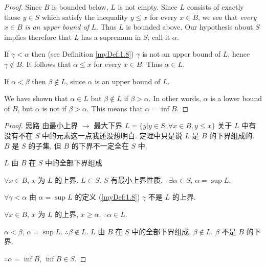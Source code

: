 \begin{proof}
Since $B$ is bounded below, $L$ is not empty. Since $L$ consists of
exactly those $y \in S$ which satisfy the inequality $y \leq x$ for every $x \in B$, we
see that \emph{every} $x \in B$ \emph{is an upper bound of} $L$. Thus $L$ is bounded above.
Our hypothesis about $S$ implies therefore that $L$ has a supremum in $S$;
call it $\alpha$.

If $\gamma <\alpha$ then (see Definition \ref{myDef:1.8}) $\gamma$ is not an upper bound of $L$,
hence $\gamma \not\in B$. It follows that $\alpha \leq x$ for every $x \in B$. Thus $\alpha \in L$.

If $\alpha < \beta$ then $\beta \not\in L$, since $\alpha$ is an upper bound of $L$.

We have shown that $\alpha \in L$ but $\beta \not\in  L$ if $\beta>\alpha$. In other words, $\alpha$
is a lower bound of $B$, but $\alpha$ is not if $\beta > \alpha$. This means that $\alpha = \inf B$.
\end{proof}


    \begin{proof}
思路 由最小上界 $\rightarrow $ 最大下界
$L = \{y| y\in S; \forall x\in B, y\leq x\}$
    关于 $L$ 中有没有不在 $S$ 中的元素这一点我还没想明白. 定理中只是说 $L$ 是 $B$ 的下界组成的. $B$ 是 $S$ 的子集, 但 $B$ 的下界不一定全在 $S$ 中. 

$L$ 由 $B$ 在 $S$ 中的全部下界组成

$\forall x\in B$, $x$ 为 $L$ 的上界. $L\subset S$.
$S$ 有最小上界性质,
$\therefore \exists \alpha\in S$, $\alpha = \sup L$.

$\forall \gamma <\alpha$ 由 $\alpha = \sup L$ 的定义 (\ref{myDef:1.8})
$\gamma$ 不是 $L$ 的上界.

$\forall x \in B$, $x$ 为 $L$ 的上界, $x \geq \alpha$. $\therefore \alpha \in L$.

$\alpha < \beta$, $\alpha = \sup L$. $\therefore \beta \not\in L$.
$L$ 由 $B$ 在 $S$ 中的全部下界组成, $\beta \not\in L$.
$\beta$ 不是 $B$ 的下界.

$\therefore \alpha = \inf B$, $\inf B\in S$.
    \end{proof}


